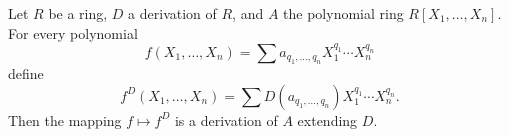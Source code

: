 Let $R$ be a ring, $D$ a derivation of $R$, and $A$ the polynomial ring $R[X_1, \ldots, X_n]$. For every polynomial
$$f(X_1, \ldots, X_n) = \sum a_{q_1, \ldots, q_n} X_1^{q_1} \cdots X_n^{q_n}$$
define
$$f^D(X_1, \ldots, X_n) = \sum D(a_{q_1, \ldots, q_n}) X_1^{q_1} \cdots X_n^{q_n}.$$
Then the mapping $f \mapsto f^D$ is a derivation of $A$ extending $D$.

